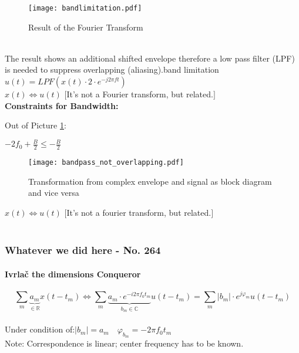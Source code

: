 \begin{figure}[H]
	\centering
	\texttt{[image: bandlimitation.pdf]}
	\caption{Result of the Fourier Transform}
	\label{ResultFourier} 
\end{figure}


\ \\
The result shows an additional shifted envelope \pfeil therefore a low pass filter (LPF) is needed to suppress overlapping (aliasing).\pfeil band limitation\\
\pfeil $u(t) = LPF( x(t) \cdot 2\cdot e^{-j2 \pi f t } )$
\ \\$x(t) \iff u(t)$ $[$It's not a Fourier transform, but related.$]$\\

\textbf{Constraints for Bandwidth:}

Out of Picture \ref{ResultFourier}:

\quad $-2f_0+\frac{B}{2} \leq -\frac{B}{2} $ 



\begin{figure}[H]
	\centering
	\texttt{[image: bandpass\_not\_overlapping.pdf]}
	\caption{Transformation from complex envelope and signal as block diagram and vice versa}
	\label{complexEnvelopTransform} 
\end{figure}
$x(t) \iff u(t)$ $[$It's not a fourier transform, but related.$]$\\
\ \\

\subsubsection{Whatever we did here - No. 264}
\paragraph{\texorpdfstring{Ivrla\v c}{Ivrlac} the dimensions Conqueror }

\[\sum_{m}\underbrace{a_m}_{\in \mathbb{R}}x(t-t_m) \iff \sum_{m}\underbrace{a_m \cdot e^{-i 2\pi f_0 t_m}}_{b_m \in \mathbb{C}}u(t-t_m)  = \sum_{m} |b_m| \cdot e^{j\varphi_m} u(t-t_m)\] \\
Under condition of:$\vert b_m\vert = a_m \quad  \varphi_{b_m}= -2\pi f_0 t_m$\\
Note: Correspondence is linear; center frequency has to be known.\\

